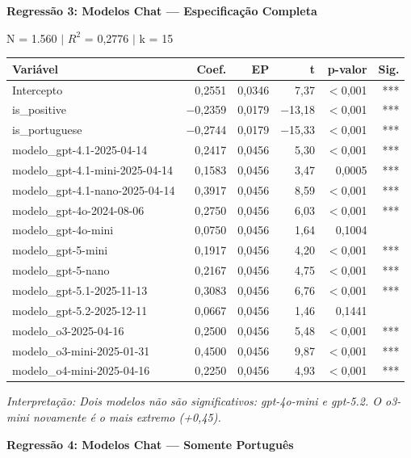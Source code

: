 \documentclass[12pt,a4paper]{article}
\begin{document}
\vspace{0.5cm}
\noindent\textbf{Regressão 3: Modelos Chat --- Especificação Completa}

\noindent N = 1.560 $|$ $R^2$ = 0,2776 $|$ k = 15

\begin{table}[H]
\centering
\small
\begin{tabular}{lrrrrr}
\toprule
\textbf{Variável} & \textbf{Coef.} & \textbf{EP} & \textbf{t} & \textbf{p-valor} & \textbf{Sig.} \\
\midrule
Intercepto & 0,2551 & 0,0346 & 7,37 & $<$0,001 & *** \\
is\_positive & $-$0,2359 & 0,0179 & $-$13,18 & $<$0,001 & *** \\
is\_portuguese & $-$0,2744 & 0,0179 & $-$15,33 & $<$0,001 & *** \\
modelo\_gpt-4.1-2025-04-14 & 0,2417 & 0,0456 & 5,30 & $<$0,001 & *** \\
modelo\_gpt-4.1-mini-2025-04-14 & 0,1583 & 0,0456 & 3,47 & 0,0005 & *** \\
modelo\_gpt-4.1-nano-2025-04-14 & 0,3917 & 0,0456 & 8,59 & $<$0,001 & *** \\
modelo\_gpt-4o-2024-08-06 & 0,2750 & 0,0456 & 6,03 & $<$0,001 & *** \\
modelo\_gpt-4o-mini & 0,0750 & 0,0456 & 1,64 & 0,1004 & \\
modelo\_gpt-5-mini & 0,1917 & 0,0456 & 4,20 & $<$0,001 & *** \\
modelo\_gpt-5-nano & 0,2167 & 0,0456 & 4,75 & $<$0,001 & *** \\
modelo\_gpt-5.1-2025-11-13 & 0,3083 & 0,0456 & 6,76 & $<$0,001 & *** \\
modelo\_gpt-5.2-2025-12-11 & 0,0667 & 0,0456 & 1,46 & 0,1441 & \\
modelo\_o3-2025-04-16 & 0,2500 & 0,0456 & 5,48 & $<$0,001 & *** \\
modelo\_o3-mini-2025-01-31 & 0,4500 & 0,0456 & 9,87 & $<$0,001 & *** \\
modelo\_o4-mini-2025-04-16 & 0,2250 & 0,0456 & 4,93 & $<$0,001 & *** \\
\bottomrule
\end{tabular}
\end{table}

\noindent\textit{Interpretação: Dois modelos não são significativos: gpt-4o-mini e
gpt-5.2. O o3-mini novamente é o mais extremo (+0,45).}

\vspace{0.5cm}
\noindent\textbf{Regressão 4: Modelos Chat --- Somente Português}
\end{document}
